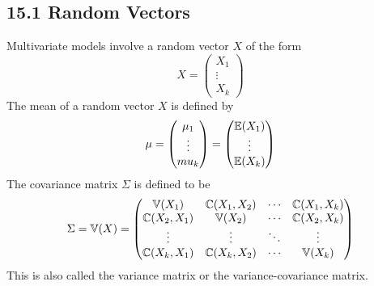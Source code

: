 \subsection*{15.1 Random Vectors}\label{random-vectors}
    Multivariate models involve a random vector \(X\) of the form
\[
X = \begin{pmatrix} X_{1} \\ \vdots \\ X_{k} \end{pmatrix}
\]
The mean of a random vector \(X\) is defined by
\[
\mu 
= \begin{pmatrix} \mu_{1} \\ \vdots \\ mu_{k} \end{pmatrix} 
= \begin{pmatrix} \operatorname{\mathbb{E}}(X_{1}) \\ \vdots \\ \operatorname{\mathbb{E}}(X_{k}) \end{pmatrix}
\]
The covariance matrix \(\Sigma\) is defined to be
\[
\Sigma = \operatorname{\mathbb{V}}(X) = \begin{pmatrix}
\operatorname{\mathbb{V}}(X_{1}) & \operatorname{\mathbb{C}}(X_{1}, X_{2}) & \cdots & \operatorname{\mathbb{C}}(X_{1}, X_{k}) \\
\operatorname{\mathbb{C}}(X_{2}, X_{1}) & \operatorname{\mathbb{V}}(X_{2}) & \cdots & \operatorname{\mathbb{C}}(X_{2}, X_{k}) \\
\vdots & \vdots & \ddots & \vdots \\
\operatorname{\mathbb{C}}(X_{k}, X_{1}) & \operatorname{\mathbb{C}}(X_{k}, X_{2}) & \cdots & \operatorname{\mathbb{V}}(X_{k})
\end{pmatrix}
\]
This is also called the variance matrix or the variance-covariance
matrix.


